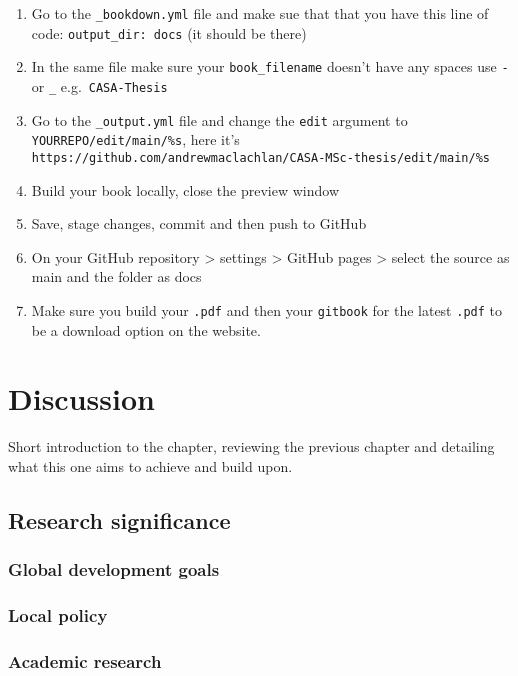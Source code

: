 \documentclass[
  12pt,
  oneside]{book}
\providecommand{\tightlist}{%
  \setlength{\itemsep}{0pt}\setlength{\parskip}{0pt}}
\begin{document}
\begin{enumerate}
\def\labelenumi{\arabic{enumi}.}
\tightlist
\item
  Go to the \texttt{\_bookdown.yml} file and make sue that that you have this line of code: \texttt{output\_dir:\ docs} (it should be there)
\item
  In the same file make sure your \texttt{book\_filename} doesn't have any spaces use \texttt{-} or \texttt{\_} e.g.~\texttt{CASA-Thesis}
\item
  Go to the \texttt{\_output.yml} file and change the \texttt{edit} argument to \texttt{YOURREPO/edit/main/\%s}, here it's \texttt{https://github.com/andrewmaclachlan/CASA-MSc-thesis/edit/main/\%s}
\item
  Build your book locally, close the preview window
\item
  Save, stage changes, commit and then push to GitHub
\item
  On your GitHub repository \textgreater{} settings \textgreater{} GitHub pages \textgreater{} select the source as main and the folder as docs
\item
  Make sure you build your \texttt{.pdf} and then your \texttt{gitbook} for the latest \texttt{.pdf} to be a download option on the website.
\end{enumerate}

\chapter{Discussion}\label{discussion}

Short introduction to the chapter, reviewing the previous chapter and detailing what this one aims to achieve and build upon.

\section{Research significance}\label{research-significance}

\subsection{Global development goals}\label{global-development-goals}

\subsection{Local policy}\label{local-policy}

\subsection{Academic research}\label{academic-research}
\end{document}
